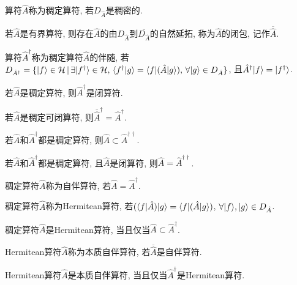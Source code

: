 \begin{definition}
    算符$\hat{A}$称为稠定算符, 若$D_{\hat{A}}$是稠密的.
\end{definition}
\begin{definition}
    若$\hat{A}$是有界算符, 则存在$\hat{A}$的由$D_{\hat{A}}$到$\overline{D_{\hat{A}}}$的自然延拓, 称为$\hat{A}$的闭包, 记作$\overline{\hat{A}}$.
\end{definition}
\begin{definition}
    算符$\hat{A}^{\dagger}$称为稠定算符$\hat{A}$的伴随, 若$D_{\hat{A}^{\dagger}}=\{|f\rangle\in\mathcal{H}\,|\,\exists|f^{\dagger}\rangle\in\mathcal{H},\,\langle f^{\dagger}|g\rangle=\langle f|(\hat{A}|g\rangle),\,\forall|g\rangle\in D_{\hat{A}}\}$, 且$\hat{A}^{\dagger}|f\rangle=|f^{\dagger}\rangle$.
\end{definition}
\begin{definition}
    若$\hat{A}$是稠定算符, 则$\hat{A}^{\dagger}$是闭算符.
\end{definition}
\begin{definition}
    若$\hat{A}$是稠定可闭算符, 则$\overline{\hat{A}}^{\dagger}=\hat{A}^{\dagger}$.
\end{definition}
\begin{definition}
    若$\hat{A}$和$\hat{A}^{\dagger}$都是稠定算符, 则$\hat{A}\subset\hat{A}^{\dagger\dagger}$.
\end{definition}
\begin{definition}
    若$\hat{A}$和$\hat{A}^{\dagger}$都是稠定算符, 且$\hat{A}$是闭算符, 则$\hat{A}=\hat{A}^{\dagger\dagger}$.
\end{definition}

\begin{definition}
    稠定算符$\hat{A}$称为自伴算符, 若$\hat{A}=\hat{A}^{\dagger}$.
\end{definition}
\begin{definition}
    稠定算符$\hat{A}$称为Hermitean算符, 若$(\langle f|\hat{A})|g\rangle=\langle f|(\hat{A}|g\rangle)$, $\forall|f\rangle, |g\rangle\in D_{\hat{A}}$.
\end{definition}
\begin{theorem}
    稠定算符$\hat{A}$是Hermitean算符, 当且仅当$\hat{A}\subset\hat{A}^{\dagger}$.
\end{theorem}
\begin{definition}
    Hermitean算符$\hat{A}$称为本质自伴算符, 若$\overline{\hat{A}}$是自伴算符.
\end{definition}
\begin{theorem}
    Hermitean算符$\hat{A}$是本质自伴算符, 当且仅当$\hat{A}^{\dagger}$是Hermitean算符.
\end{theorem}

